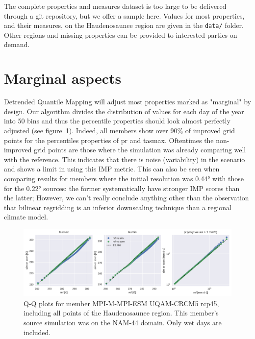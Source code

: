 \documentclass[letterpaper,10pt]{article}
\begin{document}
The complete properties and measures dataset is too large to be delivered through a git repository, but we offer a sample here.
Values for most properties, and their measures, on the Haudenosaunee region are given in the \texttt{data/} folder.
Other regions and missing properties can be provided to interested parties on demand.

\section{Marginal aspects}\label{sec:marg}
Detrended Quantile Mapping will adjust most properties marked as "marginal" by design.
Our algorithm divides the distribution of values for each day of the year into 50 bins and thus the percentile properties should look almost perfectly adjusted (see figure~\ref{fig:qq}).
Indeed, all members show over 90\% of improved grid points for the percentiles properties of pr and tasmax.
Oftentimes the non-improved grid points are those where the simulation was already comparing well with the reference.
This indicates that there is noise (variability) in the scenario and shows a limit in using this IMP metric.
This can also be seen when comparing results for members where the initial resolution was 0.44° with those for the 0.22° sources: the former systematically have stronger IMP scores than the latter;
However, we can't really conclude anything other than the observation that bilinear regridding is an inferior downscaling technique than a regional climate model.

\begin{figure}
\centering
\includegraphics[width=\textwidth]{../images/QQplots.pdf}
\caption{Q-Q plots for member MPI-M-MPI-ESM UQAM-CRCM5 rcp45, including all points of the Haudenosaunee region. This member's source simulation was on the NAM-44 domain. Only wet days are included.}\label{fig:qq}
\end{figure}
\end{document}
